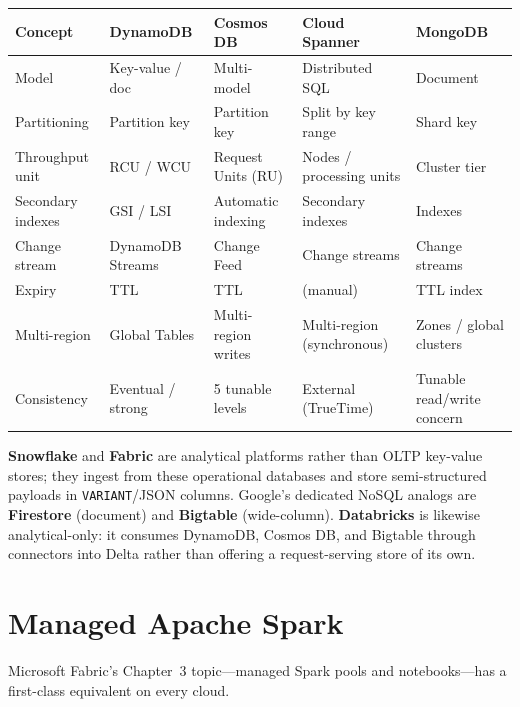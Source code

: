 \begin{center}
\footnotesize
\begin{tabular}{@{}p{2.8cm}p{2.9cm}p{2.9cm}p{2.9cm}p{2.4cm}@{}}
\toprule
\textbf{Concept} & \textbf{DynamoDB} & \textbf{Cosmos DB} & \textbf{Cloud Spanner} & \textbf{MongoDB} \\
\midrule
Model & Key-value / doc & Multi-model & Distributed SQL & Document \\
Partitioning & Partition key & Partition key & Split by key range & Shard key \\
Throughput unit & RCU / WCU & Request Units (RU) & Nodes / processing units & Cluster tier \\
Secondary indexes & GSI / LSI & Automatic indexing & Secondary indexes & Indexes \\
Change stream & DynamoDB Streams & Change Feed & Change streams & Change streams \\
Expiry & TTL & TTL & (manual) & TTL index \\
Multi-region & Global Tables & Multi-region writes & Multi-region (synchronous) & Zones / global clusters \\
Consistency & Eventual / strong & 5 tunable levels & External (TrueTime) & Tunable read/write concern \\
\bottomrule
\end{tabular}
\end{center}

\noindent \textbf{Snowflake} and \textbf{Fabric} are analytical platforms rather than OLTP key-value
stores; they ingest from these operational databases and store semi-structured payloads in
\texttt{VARIANT}/JSON columns. Google's dedicated NoSQL analogs are \textbf{Firestore} (document)
and \textbf{Bigtable} (wide-column). \textbf{Databricks} is likewise analytical-only: it consumes
DynamoDB, Cosmos DB, and Bigtable through connectors into Delta rather than offering a
request-serving store of its own.

\section{Managed Apache Spark}
%
Microsoft Fabric's Chapter~3 topic---managed Spark pools and notebooks---has a first-class
equivalent on every cloud.

